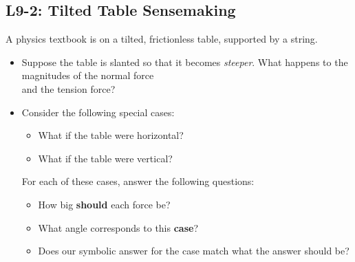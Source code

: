 \documentclass[]{article}
\begin{document}
\begin{PresentSpace}
\vspace{-10pt}
\section*{L9-2: Tilted Table Sensemaking}
\vspace{-10pt}
A physics textbook is on a tilted, frictionless table, supported by a string.
\begin{itemize}
	\item Suppose the table is slanted so that it becomes \textit{steeper}. What happens to the magnitudes of the normal force \\
	and the tension force?%
	\begin{comment}
		\large
		\item Does the magnitude of the normal force \\
		\textit{increase}, \textit{decrease}, or \textit{stay the same}?
		\item Does the magnitude of the tension force \\ \textit{increase}, \textit{decrease}, or \textit{stay the same}?
	\end{comment}
	\item Consider the following special cases:
	\begin{itemize}
		\large
		\item What if the table were horizontal?
		\item What if the table were vertical?
	\end{itemize}
	\vspace{-8pt}
	For each of these cases, answer the following questions:
	\begin{itemize}
		\large
		\item How big \textbf{should} each force be?
		\item What angle corresponds to this \textbf{case}?
		\item Does our symbolic answer for the case match what the answer should be?
	\end{itemize}
	\begin{comment}
	\item What if the table were horizontal?
	\begin{itemize}
		\item How big \textbf{should} each force be?
		\item What angle corresponds to this \textbf{case}?

\end{comment}
\end{itemize}
\end{PresentSpace}
\end{document}

